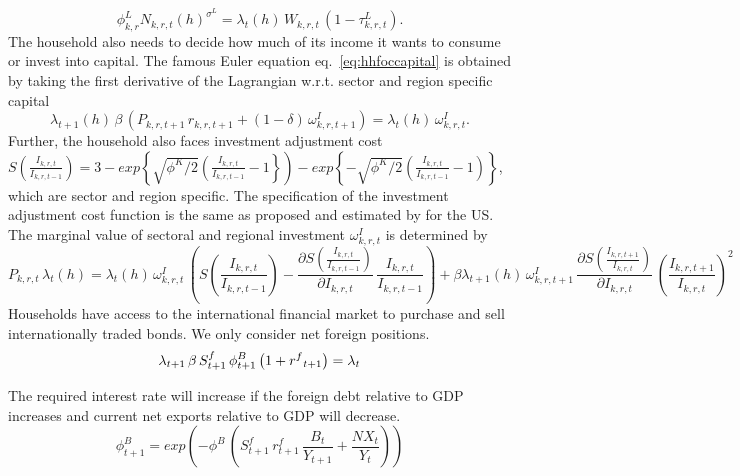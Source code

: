 \documentclass[10pt,a4paper]{article}
\begin{document}
\begin{dmath}\label{eq:hhlaboursupply}
\phi^{L}_{k,r} N_{k,r,t}(h)^{\sigma^{L}} = \lambda_{t}(h) \, W_{k,r,t} \, (1 - \tau^{L}_{k,r,t}).
\end{dmath}
The household also needs to decide how much of its income it wants to consume or invest into capital. The famous Euler equation eq.~\ref{eq:hhfoccapital} is obtained by taking the first derivative of the Lagrangian w.r.t. sector and region specific capital
\begin{dmath}\label{eq:hhfoccapital}
\lambda_{t+1}(h) \, \beta \, \left(P_{k,r,t+1} \, r_{k,r,t+1} + (1 - \delta) \, \omega^{I}_{k,r,t+1} \right) = \lambda_{t}(h) \, \omega^{I}_{k,r,t}.
\end{dmath}
Further, the household also faces investment adjustment cost $S(\frac{I_{k,r,t}}{I_{k,r,t-1}}) = 3 - exp\left\lbrace\sqrt{\phi^{K}/2}\left(\frac{I_{k,r,t}}{I_{k,r,t-1}}-1\right\rbrace\right) - exp\left\lbrace-\sqrt{\phi^{K}/2}\left(\frac{I_{k,r,t}}{I_{k,r,t-1}}-1\right)\right\rbrace$, which are sector and region specific. The specification of the investment adjustment cost function is the same as proposed and estimated by \cite{christiano2014risk} for the US.  The marginal value of sectoral and regional investment $\omega^{I}_{k,r,t}$ is determined by
\begin{dmath}\label{eq:hhfocinvestment}
P_{k,r,t} \, \lambda_{t}(h) = \lambda_{t}(h) \, \omega^{I}_{k,r,t} \, \left(S(\frac{I_{k,r,t}}{I_{k,r,t-1}}) - \frac{\partial S(\frac{I_{k,r,t}}{I_{k,r,t-1}})}{\partial I_{k,r,t}} \, \frac{I_{k,r,t}}{I_{k,r,t-1}} \right) + \beta \lambda_{t+1}(h) \, \omega^{I}_{k,r,t+1} \, \frac{\partial S(\frac{I_{k,r,t+1}}{I_{k,r,t}})}{\partial I_{k,r,t}} \, \left(\frac{I_{k,r,t+1}}{I_{k,r,t}}\right)^2
\end{dmath}
Households have access to the international financial market to purchase and sell internationally traded bonds. We only consider net foreign positions.
\begin{dmath}
\lambda_{t+1} \, \beta \, S^{f}_{t+1} \, \phi^{B}_{t+1} \left(1+{{r^{f}}_{t+1}}\right) = \lambda_{t} \\
\end{dmath}

The required interest rate will increase if the foreign debt relative to GDP increases and current net exports relative to GDP will decrease. 
\begin{dmath}
\phi^{B}_{t+1} = exp \left(-\phi^B \,(S^{f}_{t+1} \, r^{f}_{t+1} \, \frac{B_{t}}{Y_{t+1}}+\frac{NX_{t}}{Y_t})\right)
\end{dmath}
\end{document}
